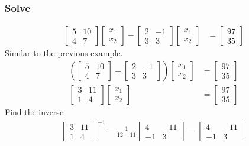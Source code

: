 \documentclass[14pt]{extarticle}
\begin{document}
\subsubsection{Solve}
\begin{align*}
	\begin{bmatrix}
		5 & 10 \\
		4 & 7
	\end{bmatrix}
	\begin{bmatrix}
		x_1 \\
		x_2
	\end{bmatrix}
	- \begin{bmatrix}
		2 & -1 \\
		3 & 3
	\end{bmatrix}
	\begin{bmatrix}
		x_1 \\
		x_2
	\end{bmatrix}
	&= \begin{bmatrix} 97 \\ 35 \end{bmatrix}	
\end{align*}
Similar to the previous example.
\begin{align*}
	\left(
	\begin{bmatrix}
		5 & 10 \\
		4 & 7
	\end{bmatrix}
	- \begin{bmatrix}
		2 & -1 \\
		3 & 3
	\end{bmatrix}
	\right)
	\begin{bmatrix}
		x_1 \\
		x_2
	\end{bmatrix}
	&= \begin{bmatrix} 97 \\ 35 \end{bmatrix} \\
	\begin{bmatrix}
		3 & 11 \\
		1 & 4
	\end{bmatrix}
	\begin{bmatrix}
		x_1 \\
		x_2
	\end{bmatrix}
	&= \begin{bmatrix} 97 \\ 35 \end{bmatrix}
\end{align*}
Find the inverse
\begin{align*}
	\begin{bmatrix}
		3 & 11 \\
		1 & 4
	\end{bmatrix}^{-1}
	= \frac{1}{12-11}\begin{bmatrix}
		4 & -11 \\
		-1 & 3
	\end{bmatrix}
	= \begin{bmatrix}
		4 & -11 \\
		-1 & 3
	\end{bmatrix}
\end{align*}
\end{document}
